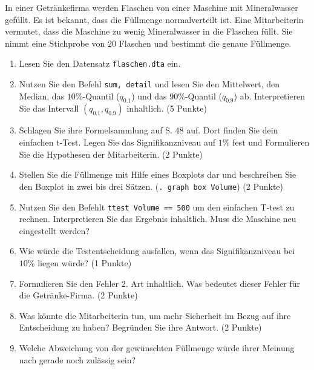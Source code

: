 \documentclass[11pt]{article}
\newcommand{\punkte}[1]{{\small{ }(#1 Punkte)}}
\begin{document}
\begin{enumerate}
In einer Getränkefirma werden Flaschen von einer Maschine mit Mineralwasser gefüllt. Es ist bekannt,
dass die Füllmenge normalverteilt ist. Eine Mitarbeiterin vermutet, dass die Maschine zu wenig
Mineralwasser in die Flaschen füllt. Sie nimmt eine Stichprobe von $20$ Flaschen und bestimmt die
genaue Füllmenge.
\begin{enumerate}
\item{Lesen Sie den Datensatz \texttt{flaschen.dta} ein.}
\item{Nutzen Sie den Befehl \texttt{sum, detail} und lesen Sie den Mittelwert, den Median, das $10\%$-Quantil ($q_{0.1}$)
und das $90\%$-Quantil ($q_{0.9}$) ab. Interpretieren Sie das Intervall $(q_{0.1},q_{0.9})$ inhaltlich.} \punkte{5}
\item{Schlagen Sie ihre Formelsammlung auf S. 48 auf. Dort finden Sie dein einfachen t-Test. 
Legen Sie das Signifikanzniveau auf $1\%$ fest und Formulieren Sie die Hypothesen der Mitarbeiterin.}\punkte{2}
\item{Stellen Sie die Füllmenge mit Hilfe eines Boxplots dar und beschreiben Sie den Boxplot in zwei
bis drei Sätzen. (\texttt{. graph box Volume})}\punkte{2}
\item{Nutzen Sie den Befehlt \texttt{ttest Volume == 500} um den einfachen T-test zu rechnen.
Interpretieren Sie das Ergebnis inhaltlich. Muss die Maschine neu eingestellt werden?}
\item{Wie würde die Testentscheidung ausfallen, wenn das Signifikanzniveau bei $10\%$ liegen würde?}\punkte{1}
\item{Formulieren Sie den Fehler 2. Art inhaltlich. Was bedeutet dieser Fehler für die Getränke-Firma.}\punkte{2}
\item{Was könnte die Mitarbeiterin tun, um mehr Sicherheit im Bezug auf ihre Entscheidung zu haben? Begründen Sie 
ihre Antwort.}\punkte{2}
\item{Welche Abweichung von der gewünschten Füllmenge würde ihrer Meinung nach gerade noch zulässig sein?}
\end{enumerate}


\end{enumerate}
\end{document}
